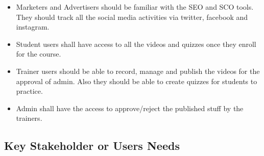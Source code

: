 \documentclass{report}
\begin{document}
\begin{itemize}
    \item Marketers and Advertisers should be familiar with the SEO and SCO tools. They should track all the social media activities via twitter, facebook and instagram.
    \item Student users shall have access to all the videos and quizzes once they enroll for the course.
    \item Trainer users should be able to record, manage and publish the videos for the approval of admin. Also they should be able to create quizzes for students to practice.
    \item Admin shall have the access to approve/reject the published stuff by the trainers.
\end{itemize}

\subsection{Key Stakeholder or Users Needs}
\end{document}
